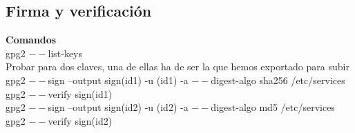 \documentclass[11pt]{article}
\begin{document}
    \subsection{Firma y verificación}
      \par
      \textbf{Comandos}\\
      gpg2 $--$list-keys\\
      Probar para dos claves, una de ellas ha de ser la que hemos exportado para subir\\
      \vspace{2mm}
      gpg2 $--$sign --output sign(id1) -u (id1) -a $--$digest-algo sha256 /etc/services\\
      gpg2 $--$verify sign(id1)\\
      \vspace{2mm}
      gpg2 $--$sign --output sign(id2) -u (id2) -a $--$digest-algo md5 /etc/services\\
      gpg2 $--$verify sign(id2)\\
\end{document}
